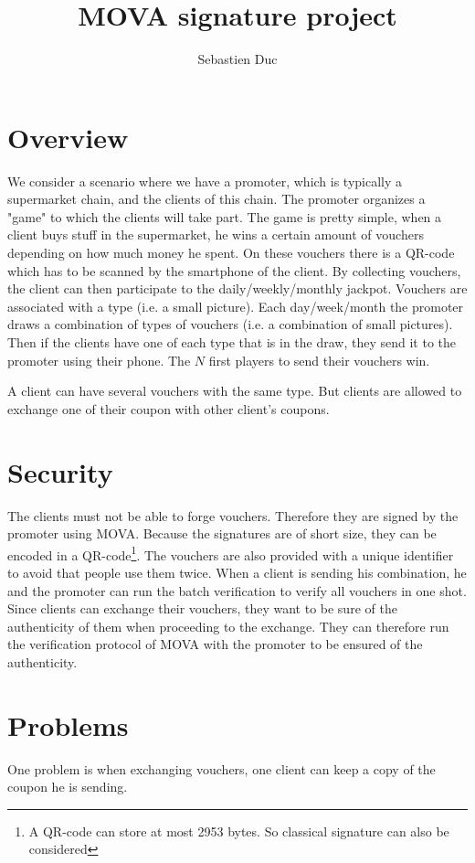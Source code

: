 \documentclass[12pt,a4paper]{article}
\title{MOVA signature project}
\author{Sebastien Duc}
\date{}
\begin{document}
    \maketitle
    
    \section{Overview}
    We consider a scenario where we have a promoter, which is typically a supermarket chain, and the clients of this chain.
    The promoter organizes a "game" to which the clients will take part. The game is pretty simple, when a client buys stuff in the supermarket, he wins a certain amount of 
    vouchers depending on how much money he spent. On these vouchers there is a QR-code which has to be scanned by the smartphone of the client. By collecting vouchers, the client can then
    participate to the daily/weekly/monthly jackpot. Vouchers are associated with a type (i.e. a small picture). Each day/week/month the promoter draws a combination of types
    of vouchers (i.e. a combination of small pictures). Then if the clients have one of each type that is in the draw, they send it to the promoter using their phone.
    The $N$ first players to send  their vouchers win. 

    A client can have several vouchers with the same type. But clients are allowed to exchange one of their coupon with other client's coupons. 

    \section{Security}
    The clients must not be able to forge vouchers. Therefore they are signed by the promoter using MOVA. Because the signatures are of short size, they can be encoded in a 
    QR-code\footnote{A QR-code can store at most 2953 bytes. So classical signature can also be considered}.  
    The vouchers are also provided with a unique identifier to avoid that people use them twice.
    When a client is sending his combination, he and the promoter can run the batch verification to verify all vouchers in one shot.
    Since clients can exchange their vouchers, they want to be sure of the authenticity of them when proceeding to the exchange. 
    They can therefore run the verification protocol of MOVA with the promoter to be ensured of the authenticity.
   
    \section{Problems}
    One problem is when exchanging vouchers, one client can keep a copy of the coupon he is sending.
    
\end{document}
